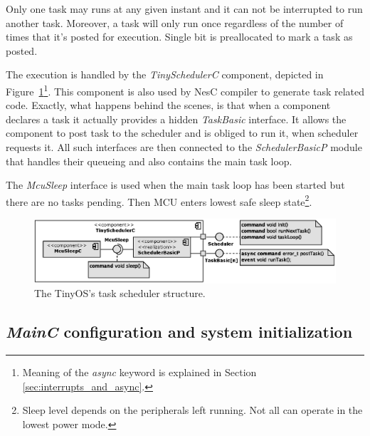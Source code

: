 Only one task may runs at any given instant and it can not be
interrupted to run another task. Moreover, a task will only run once
regardless of the number of times that it's posted for execution.
Single bit is preallocated to mark a task as posted.

The execution is handled by the \emph{TinySchedulerC} component,
depicted in Figure~\ref{fig:tinyschedulerc}\footnote{Meaning of the
\emph{async} keyword is explained in Section
\ref{sec:interrupts_and_async}.}. This component is also used by NesC
compiler to generate task related code. Exactly, what happens behind
the scenes, is that when a component declares a task it actually
provides a hidden \emph{TaskBasic} interface. It allows the component
to post task to the scheduler and is obliged to run it, when scheduler
requests it.  All such interfaces are then connected to the
\emph{SchedulerBasicP} module that handles their queueing and also
contains the main task loop.

The \emph{McuSleep} interface is used when the main task loop has been
started but there are no tasks pending. Then MCU enters lowest safe
sleep state\footnote{Sleep level depends on the peripherals left
running. Not all can operate in the lowest power mode.}.

\begin{figure}[h]
  \centering
  \includegraphics[width=1.02\textwidth]{diagrams/tinyschedulerc.eps}
  \caption{The TinyOS's task scheduler structure.}
  \label{fig:tinyschedulerc}
\end{figure}

\subsection{\emph{MainC} configuration and system initialization}

